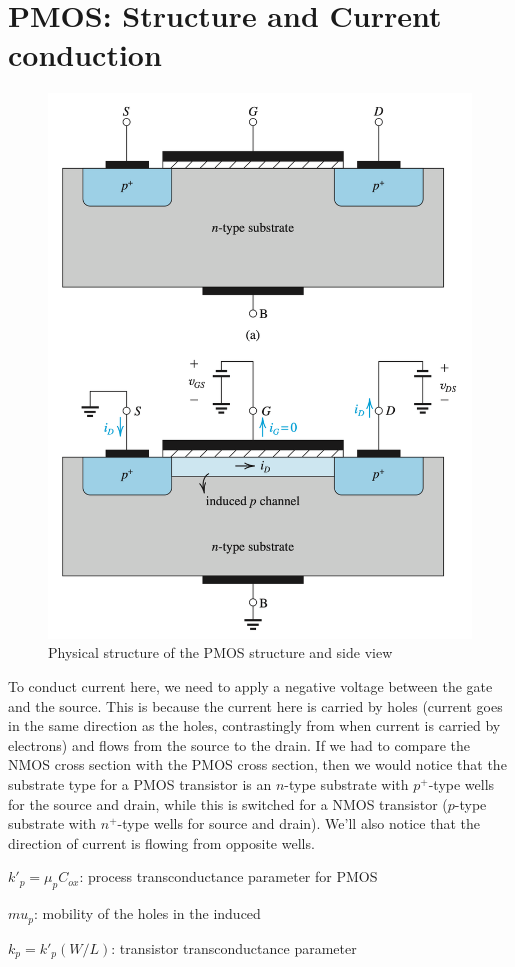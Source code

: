\section{PMOS: Structure and Current conduction}
\begin{figure}[htb]
    \centering
    \includegraphics[scale=0.5]{figs/ch05/pmos_structure.png}
    \caption{Physical structure of the PMOS structure and side view}
    \label{fig:pmos_structure}
\end{figure}
To conduct current here, we need to apply a negative voltage between the gate and the source. This is because the current here is carried by holes (current goes in the same direction as the holes, contrastingly from when current is carried by electrons) and flows from the source to the drain. If we had to compare the NMOS cross section with the PMOS cross section, then we would notice that the substrate type for a PMOS transistor is an $n$-type substrate with $p^+$-type wells for the source and drain, while this is switched for a NMOS transistor ($p$-type substrate with $n^+$-type wells for source and drain). We'll also notice that the direction of current is flowing from opposite wells.
\begin{gline}
    \item $k'_p = \mu_p C_{ox}$: process transconductance parameter for PMOS
    \item $mu_p$: mobility of the holes in the induced 
    \item $k_p = k'_p(W/L)$: transistor transconductance parameter
\end{gline}


